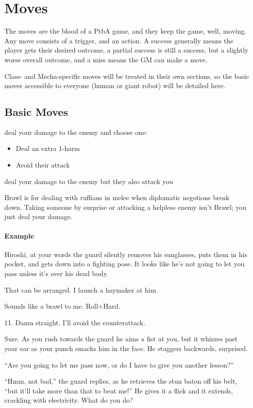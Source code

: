 \section{Moves}
The moves are the blood of a PtbA game, and they keep the game,
well, moving. Any move consists of a trigger, and an action. A success
generally means the player gets their desired outcome, a partial
success is still a success, but a slightly worse overall outcome, and
a miss means the GM can make a move.

Class- and Mecha-specific moves will be treated in their own sections,
so the basic moves accessible to everyone (human or giant robot) will
be detailed here.


\subsection{Basic Moves}


{deal your damage to the enemy and choose one:
\begin{itemize}
\item Deal an extra 1-harm
\item Avoid their attack
\end{itemize}}
{deal your damage to the enemy but they also attack you}

Brawl is for dealing with ruffians in melee when diplomatic negotions break down.
Taking someone by surprise or attacking a helpless enemy isn't Brawl; you just deal your damage.

\paragraph{Example}
\begin{dialogue}
   Hiroshi, at your words the guard silently removes his
  sunglasses, puts them in his pocket, and gets down into a fighting
  pose. It looks like he's not going to let you pass unless it's over
  his dead body.

   That can be arranged. I launch a haymaker at him.

   Sounds like a brawl to me. Roll+Hard.

   11. Damn straight. I'll avoid the counterattack.

   Sure. As you rush towards the guard he aims a fist at
  you, but it whizzes past your ear as your punch smacks him in the
  face. He staggers backwards, surprised.

   ``Are you going to let me pass now, or do I have to
  give you another lesson?''

   ``Hmm, not bad,'' the guard replies, as he retrieves the
  stun baton off his belt, ``but it'll take more than that to beat
  me!'' He gives it a flick and it extends, crackling with
  electricity. What do you do?
\end{dialogue}


